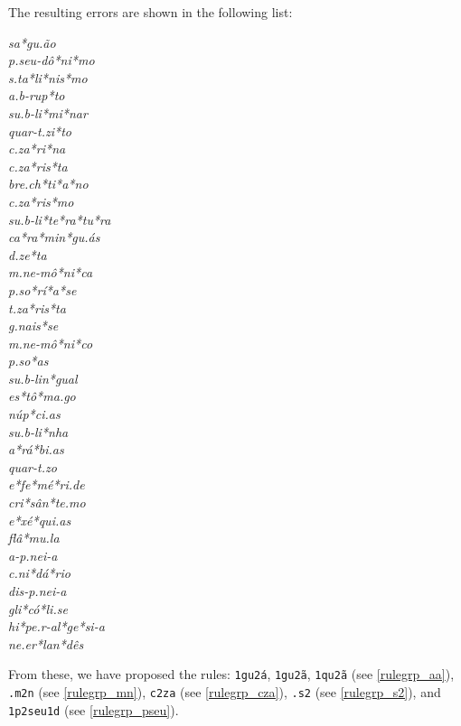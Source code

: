 The resulting errors are shown in the following list:
\begin{multicols}{5}
\setlength{\columnsep}{0pt}
\setlength{\parindent}{0pt}
\emph{sa*gu.ão \\ p.seu-dô*ni*mo \\ s.ta*li*nis*mo \\ a.b-rup*to \\ su.b-li*mi*nar \\ quar-t.zi*to \\ c.za*ri*na \\ c.za*ris*ta \\ bre.ch*ti*a*no \\ c.za*ris*mo \\ su.b-li*te*ra*tu*ra \\ ca*ra*min*gu.ás \\ d.ze*ta \\ m.ne-mô*ni*ca \\ p.so*rí*a*se \\ t.za*ris*ta \\ g.nais*se \\ m.ne-mô*ni*co \\ p.so*as \\ su.b-lin*gual \\ es*tô*ma.go \\ núp*ci.as \\ su.b-li*nha \\ a*rá*bi.as \\ quar-t.zo \\ e*fe*mé*ri.de \\ cri*sân*te.mo \\ e*xé*qui.as \\ flâ*mu.la \\ a-p.nei-a \\ c.ni*dá*rio \\ dis-p.nei-a \\ gli*có*li.se \\ hi*pe.r-al*ge*si-a \\ ne.er*lan*dês}
\end{multicols}
\noindent{}From these, we have proposed the rules: \texttt{1gu2á}, \texttt{1gu2ã}, \texttt{1qu2ã} (see \cref{rulegrp_aa}),
\texttt{.m2n} (see \cref{rulegrp_mn}), \texttt{c2za} (see \cref{rulegrp_cza}), \texttt{.s2} (see \cref{rulegrp_s2}), and \texttt{1p2seu1d} (see \cref{rulegrp_pseu}).

